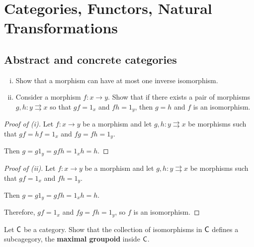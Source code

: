 \chapter{Categories, Functors, Natural Transformations}
\section{Abstract and concrete categories}

\begin{problem}
	\begin{enumerate}[(i)]
		\item Show that a morphism can have at most one inverse isomorphism.
		\item Consider a morphism $f : x \rightarrow y$.
			Show that if there exists a pair of morphisms $g,h:y \rightrightarrows x$ so that $gf = 1_x$ and $fh = 1_y$, then $g = h$ and $f$ is an isomorphism.
	\end{enumerate}
\end{problem}

\begin{proof}[Proof of (i)]
	Let $f:x \rightarrow y$ be a morphism and let $g,h:y \rightrightarrows x$ be morphisms such that
	$gf = hf = 1_x$ and $fg = fh = 1_y$.

	Then $g = g1_y = gfh = 1_x h = h$.
\end{proof}

\begin{proof}[Proof of (ii)]
	Let $f:x \rightarrow y$ be a morphism and let $g,h:y \rightrightarrows x$ be morphisms such that
	$gf = 1_x$ and $fh = 1_y$.

	Then $g = g1_y = gfh = 1_x h = h$.

	Therefore, $gf = 1_x$ and $fg = fh = 1_y$, so $f$ is an isomorphism.
\end{proof}

\begin{problem}
	Let $\mathsf{C}$ be a category.
	Show that the collection of isomorphisms in $\mathsf{C}$ defines a subcagegory, the \textbf{maximal groupoid} inside $\mathsf{C}$.
\end{problem}

